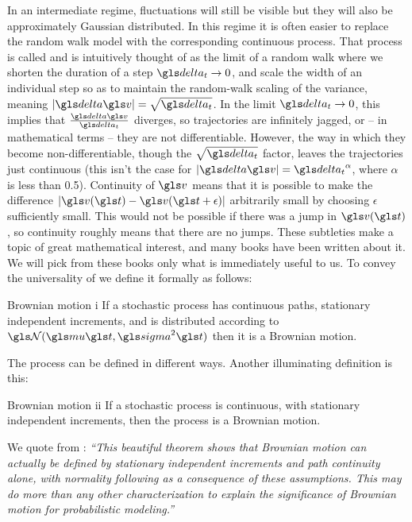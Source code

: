 In an intermediate regime, fluctuations will still be visible but they will also be approximately 
Gaussian distributed. In this regime it is often easier to replace the random walk model 
with the corresponding continuous process. That process is called \BM and is intuitively thought
of as the limit of a random walk where we shorten the duration of a step $\dt \to 0$, and 
scale the width of an individual step so as to maintain the random-walk scaling of the variance, meaning
$|\d\gv|=\sqrt{\dt}$. In the limit $\dt\to0$, this implies that $\frac{\d\gv}{\dt}$ diverges, so \BM trajectories 
are infinitely jagged, or -- in mathematical terms -- they are not differentiable. However, the way in
which they become non-differentiable, though the $\sqrt{\dt}$ factor, leaves the 
trajectories just continuous (this isn't the case for $|\d\gv|=\dt^\alpha$, where $\alpha$ is less than 0.5). 
Continuity of $\gv$ 
means that it is possible to make the difference $|\gv(\t)-\gv(\t+\epsilon)|$ arbitrarily small by choosing
$\epsilon$ sufficiently small. This would not be possible if there was a jump in $\gv(\t)$, so continuity 
roughly means that there are no jumps. These subtleties make \BM a topic of great mathematical
interest, and many books have been written about it. We will pick from these books only what is 
immediately useful to us.
To convey the universality of \BM we define it formally as follows:

\begin{defn}{Brownian motion i}
If a stochastic process has continuous paths, stationary independent increments, and is distributed according to 
$\mathcal{\N}(\gmu \t, \gsigma^2 \t)$ then it is a Brownian motion.
\end{defn}

The process can be defined in different ways. Another illuminating definition is this:

\begin{defn}{Brownian motion ii}
If a stochastic process is continuous, with stationary independent increments, then the process is a Brownian 
motion.
\end{defn}

We quote from \cite{Harrison2013}: {\it ``This beautiful theorem shows that Brownian motion can actually be defined
by stationary independent increments and path continuity alone, with normality following as a consequence 
of these assumptions. This may do more than any other characterization to explain the significance of 
Brownian motion for probabilistic modeling.''}

